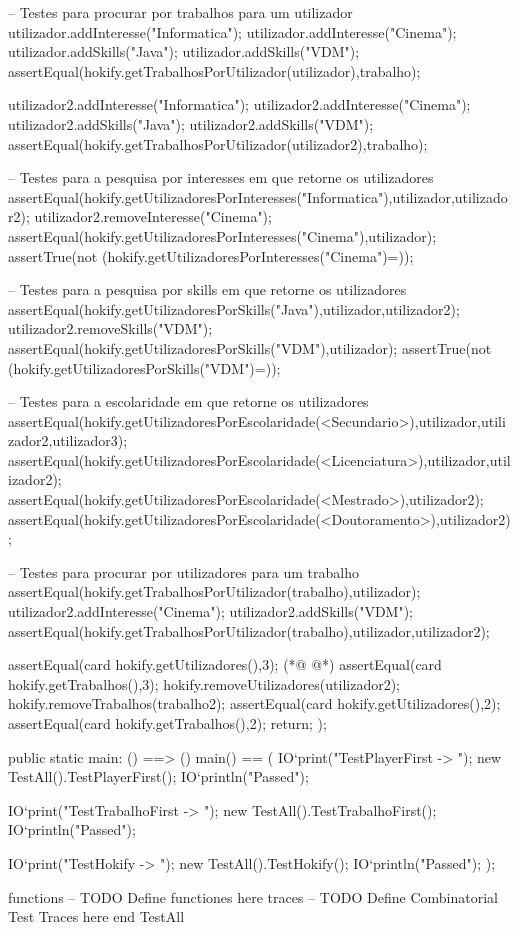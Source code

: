 \begin{vdmpp}[breaklines=true]
 -- Testes para procurar por trabalhos para um utilizador
 utilizador.addInteresse("Informatica");
 utilizador.addInteresse("Cinema");
 utilizador.addSkills("Java");
 utilizador.addSkills("VDM");
 assertEqual(hokify.getTrabalhosPorUtilizador(utilizador),{trabalho});
 
 utilizador2.addInteresse("Informatica");
 utilizador2.addInteresse("Cinema");
 utilizador2.addSkills("Java");
 utilizador2.addSkills("VDM");
 assertEqual(hokify.getTrabalhosPorUtilizador(utilizador2),{trabalho});
 
 -- Testes para a pesquisa por interesses em que retorne os utilizadores
 assertEqual(hokify.getUtilizadoresPorInteresses("Informatica"),{utilizador,utilizador2});
 utilizador2.removeInteresse("Cinema");
 assertEqual(hokify.getUtilizadoresPorInteresses("Cinema"),{utilizador});
 assertTrue(not (hokify.getUtilizadoresPorInteresses("Cinema")={}));
 
 -- Testes para a pesquisa por skills em que retorne os utilizadores
 assertEqual(hokify.getUtilizadoresPorSkills("Java"),{utilizador,utilizador2});
 utilizador2.removeSkills("VDM");
 assertEqual(hokify.getUtilizadoresPorSkills("VDM"),{utilizador});
 assertTrue(not (hokify.getUtilizadoresPorSkills("VDM")={}));
 
 -- Testes para a escolaridade em que retorne os utilizadores
 assertEqual(hokify.getUtilizadoresPorEscolaridade(<Secundario>),{utilizador,utilizador2,utilizador3});
 assertEqual(hokify.getUtilizadoresPorEscolaridade(<Licenciatura>),{utilizador,utilizador2});
 assertEqual(hokify.getUtilizadoresPorEscolaridade(<Mestrado>),{utilizador2});
 assertEqual(hokify.getUtilizadoresPorEscolaridade(<Doutoramento>),{utilizador2});
 
 -- Testes para procurar por utilizadores para um trabalho
 assertEqual(hokify.getTrabalhosPorUtilizador(trabalho),{utilizador});
 utilizador2.addInteresse("Cinema");
 utilizador2.addSkills("VDM");
 assertEqual(hokify.getTrabalhosPorUtilizador(trabalho),{utilizador,utilizador2});
 
 assertEqual(card hokify.getUtilizadores(),3);
(*@
\label{main:206}
@*)
 assertEqual(card hokify.getTrabalhos(),3);
 hokify.removeUtilizadores(utilizador2);
 hokify.removeTrabalhos(trabalho2);
 assertEqual(card hokify.getUtilizadores(),2);
 assertEqual(card hokify.getTrabalhos(),2);
 return;
);


public static main: () ==> ()
main() ==
(
 IO`print("TestPlayerFirst -> ");
 new TestAll().TestPlayerFirst();
 IO`println("Passed");
 
 IO`print("TestTrabalhoFirst -> ");
 new TestAll().TestTrabalhoFirst();
 IO`println("Passed");
 
 IO`print("TestHokify -> ");
 new TestAll().TestHokify();
 IO`println("Passed");
);

functions
-- TODO Define functiones here
traces
-- TODO Define Combinatorial Test Traces here
end TestAll
\end{vdmpp}
